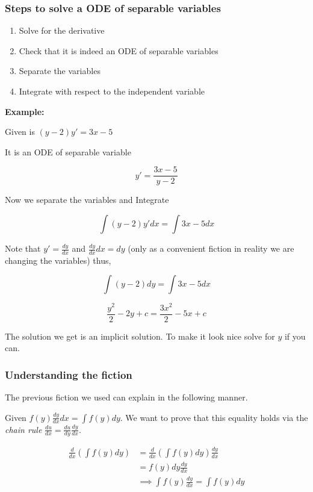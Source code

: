 \subsubsection{Steps to solve a ODE of separable variables}

\begin{enumerate}

    \item Solve for the derivative

    \item Check that it is indeed an ODE of separable variables

    \item Separate the variables

    \item Integrate with respect to the independent variable

\end{enumerate}

\textbf{Example:}

Given is \((y - 2)y' = 3x - 5\)

It is an ODE of separable variable

\[
    y' = \frac{3x - 5}{y - 2}
\]

Now we separate the variables and Integrate

\[
    \int (y - 2)y' dx = \int 3x - 5 dx
\]

Note that \(y' = \frac{dy}{dx}\) and \( \frac{dy}{dx} dx = dy\) (only as a convenient fiction
in reality we are changing the variables) thus,

\[
    \int (y - 2)dy = \int 3x - 5 dx
\]

\[
    \frac{y^2}{2} - 2y + c = \frac{3x^2}{2} - 5x + c
\]

The solution we get is an implicit solution. To make it look nice solve for \(y\)
if you can.

\subsubsection{Understanding the fiction}

The previous fiction we used can explain in the following manner.

Given \( f(y) \frac{dy}{dx} dx = \int f(y) dy\). We want to prove that this equality holds via the 
\emph{chain rule} \(\frac{du}{dx} = \frac{du}{dy} \frac{dy}{dx}\).

\begin{align*}
\frac{d}{dx} \left( \int f(y) dy \right) &= \frac{d}{dx} \left( \int f(y) dy \right) \frac{dy}{dx}\\
                                         &= f(y) dy \frac{dy}{dx}\\
                                         &\implies \int f(y) \frac{dy}{dx} = \int f(y) dy
\end{align*}
\QED


